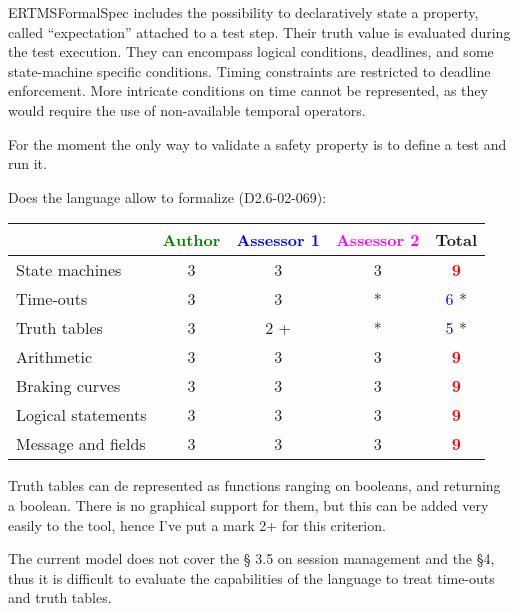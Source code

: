 \begin{assessor1}
ERTMSFormalSpec includes the possibility to declaratively state a property, called "`expectation"' attached to a test step. Their truth value is evaluated during the test execution. They can encompass logical conditions, deadlines, and some state-machine specific conditions. 
Timing constraints are restricted to deadline enforcement. More intricate conditions on time cannot be represented, as they would require the use of non-available temporal operators. 
\end{assessor1}


\begin{assessor2}
For the moment the only way to validate a safety property is to define a test and run it.
\end{assessor2}

Does the language allow to  formalize (D2.6-02-069):

\begin{tabular}{|l | c | c | c | c|}
\hline
& \textcolor{green}{Author} & \textcolor{blue}{Assessor 1} & \textcolor{magenta}{Assessor 2} & Total \\
\hline 
State machines  & 3     & 3     & 3     & \textcolor{red}{\textbf{9}} \\
\hline
Time-outs  & 3     & 3     & * & \textcolor{blue}{6} *  \\
\hline
Truth tables  & 3     & 2    + & * & \textcolor{blue}{5} *  \\
\hline
Arithmetic  & 3     & 3     & 3     & \textcolor{red}{\textbf{9}}  \\
\hline
Braking curves  & 3     & 3     & 3     & \textcolor{red}{\textbf{9}} \\
\hline
Logical statements & 3     & 3     & 3     & \textcolor{red}{\textbf{9}}  \\
\hline
Message and fields & 3     & 3     & 3     & \textcolor{red}{\textbf{9}} \\
\hline
\end{tabular}

\begin{assessor1}
Truth tables can de represented as functions ranging on booleans, and returning a boolean. There is no graphical support for them, but this can be added very easily to the tool, hence I've put a mark 2+ for this criterion. 
\end{assessor1}


\begin{assessor2}
The current model does not cover the §  3.5 on session management and the §4, thus it is difficult to evaluate the capabilities of the language to treat time-outs and truth tables.
\end{assessor2}


